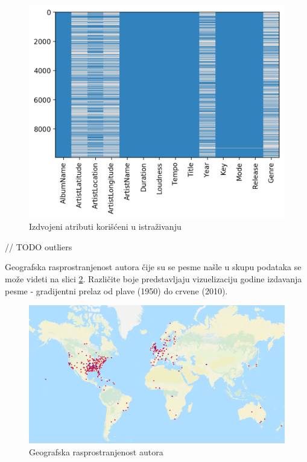 \begin{figure}[H]
    \includegraphics[scale=0.8]{resources/after_processing.png}
    \caption{Izdvojeni atributi kori\v{s}\'c{}eni u istra\v{z}ivanju}
    \label{fig:after}
\end{figure}

// TODO outliers

Geografska rasprostranjenost autora \v{c}ije su se pesme na\v{s}le u skupu podataka se mo\v{z}e videti na slici \ref{fig:Geolokacija}. Razli\v{c}ite boje predstavljaju vizuelizaciju godine izdavanja pesme - gradijentni prelaz od plave (1950) do crvene (2010).

\begin{figure}[H]
    \centering
    \includegraphics[scale=0.45]{resources/Geolokacija.png}
    \caption{Geografska rasprostranjenost autora}
    \label{fig:Geolokacija}
\end{figure}

